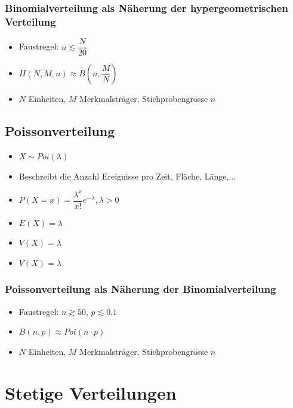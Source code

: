 \documentclass[8pt,a4paper]{scrartcl}
\begin{document}
\begin{multicols*}{3}
				\subsubsection{Binomialverteilung als Näherung der hypergeometrischen Verteilung}
					\begin{itemize}\itemsep0pt				
						\item Faustregel: $n \lesssim \dfrac{N}{20}$
						\item $H(N,M,n) \approx B(n,\dfrac{M}{N})$
						\item $N$ Einheiten, $M$ Merkmalsträger, Stichprobengrösse $n$
					\end{itemize}	
			
			\subsection{Poissonverteilung}
				\begin{itemize}\itemsep0pt				
					\item $X \sim Poi(\lambda)$
					\item Beschreibt die Anzahl Ereignisse pro Zeit, Fläche, Länge,...
					\item $P(X=x)= \dfrac{\lambda^{x}}{x!}e^{-\lambda}, \lambda > 0$
					\item $E(X)= \lambda$
					\item $V(X)= \lambda$
					\item $V(X)= \lambda$
				\end{itemize}	
				
				\subsubsection{Poissonverteilung als Näherung der Binomialverteilung}
					\begin{itemize}\itemsep0pt				
						\item Faustregel: $n \gtrsim 50$, $p \lesssim 0.1$
						\item $B(n,p) \approx Poi(n\cdot p)$
						\item $N$ Einheiten, $M$ Merkmalsträger, Stichprobengrösse $n$
					\end{itemize}	
			
		\section{Stetige Verteilungen}

\end{multicols*}
\end{document}
